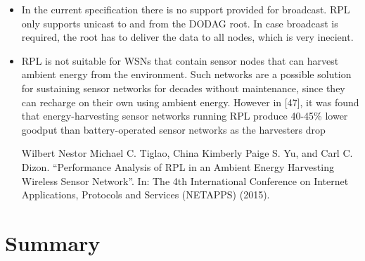 \begin{itemize}
        \item
        In the current specification there is no support provided for broadcast. RPL only
  supports unicast to and from the DODAG root. In case broadcast is required, the root
  has to deliver the data to all nodes, which is very inecient.

        \item
        RPL is not suitable for WSNs that contain sensor nodes that can harvest ambient
  energy from the environment. Such networks are a possible solution for sustaining
  sensor networks for decades without maintenance, since they can recharge on their
  own using ambient energy. However in [47], it was found that energy-harvesting sensor
  networks running RPL produce 40-45\% lower goodput than battery-operated sensor
  networks as the harvesters drop

        Wilbert Nestor Michael C. Tiglao, China Kimberly Paige S. Yu, and Carl C. Dizon.
  “Performance Analysis of RPL in an Ambient Energy Harvesting Wireless Sensor Network”.
  In: The 4th International Conference on Internet Applications, Protocols and
  Services (NETAPPS) (2015).
  \end{itemize}
    \section{Summary}
